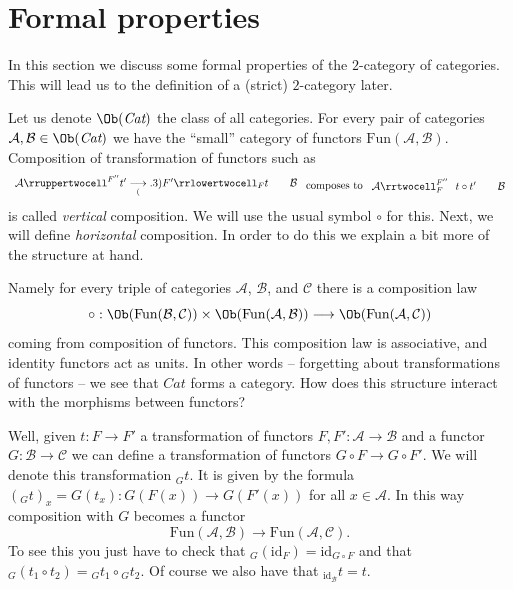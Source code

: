 \section{Formal properties}
\label{categories-section-formal-cat-cat}
In this section we discuss some formal properties of the
$2$-category of categories. This will lead us to the definition
of a (strict) $2$-category later.

\medskip\noindent
Let us denote $\Ob(\textit{Cat})$ the class of all categories.
For every pair of categories
$\mathcal{A}, \mathcal{B} \in \Ob(\textit{Cat})$
we have the ``small'' category of functors
$\text{Fun}(\mathcal{A}, \mathcal{B})$.
Composition of transformation of functors such as
$$
\begin{array}{ccc}\mathcal{A}
\rruppertwocell^{F''}{t'}
\underset{(}{\longrightarrow}.3){F'}
\rrlowertwocell_F{t} &  & \mathcal{B}\end{array}
\text{ composes to }
\begin{array}{ccc}\mathcal{A}
\rrtwocell^{F''}_F{\ \ t \circ t'} &  & \mathcal{B}\end{array}
$$
is called {\it vertical} composition. We will use the usual
symbol $\circ$ for this. Next, we will define {\it horizontal}
composition. In order to do this we explain a bit more
of the structure at hand.

\medskip\noindent
Namely for every triple
of categories $\mathcal{A}$, $\mathcal{B}$, and $\mathcal{C}$
there is a composition law
$$
\circ : \Ob(\text{Fun}(\mathcal{B}, \mathcal{C}))
\times
\Ob(\text{Fun}(\mathcal{A}, \mathcal{B}))
\longrightarrow
\Ob(\text{Fun}(\mathcal{A}, \mathcal{C}))
$$
coming from composition of functors. This composition law
is associative, and identity functors act as units. In other
words -- forgetting about transformations of functors --
we see that $\textit{Cat}$ forms a category. How does
this structure interact with the morphisms between functors?

\medskip\noindent
Well, given $t : F \to F'$ a transformation of
functors $F, F' : \mathcal{A} \to \mathcal{B}$ and
a functor
$G : \mathcal{B} \to \mathcal{C}$ we can define
a transformation of functors
$G\circ F \to G \circ F'$. We will denote this
transformation ${}_Gt$. It is given by the formula
$({}_Gt)_x = G(t_x) : G(F(x)) \to G(F'(x))$
for all $x \in \mathcal{A}$.
In this way composition
with $G$ becomes a functor
$$
\text{Fun}(\mathcal{A}, \mathcal{B})
\longrightarrow
\text{Fun}(\mathcal{A}, \mathcal{C}).
$$
To see this you just have to check that
${}_G(\text{id}_F) = \text{id}_{G \circ F}$ and that
${}_G(t_1 \circ t_2) = {}_Gt_1 \circ {}_Gt_2$.
Of course we also have that ${}_{\text{id}_\mathcal{B}}t = t$.

